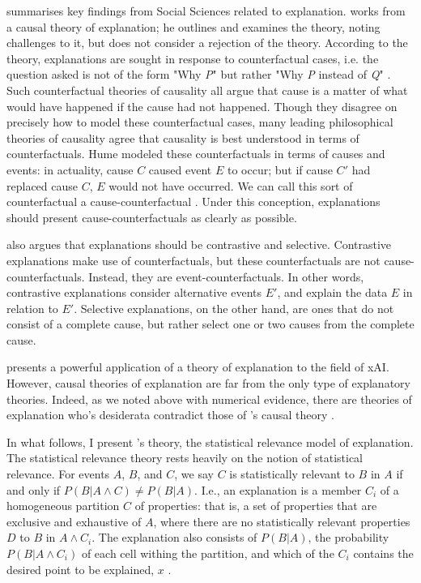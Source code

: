 \textcite{miller_explanation_2017} summarises key findings from Social Sciences related to explanation. \textcite{miller_explanation_2017} works from a causal theory of explanation; he outlines and examines the theory, noting challenges to it, but does not consider a rejection of the theory. According to the theory, explanations are sought in response to counterfactual cases, i.e. the question asked is not of the form "Why \textit{P}" but rather "Why \textit{P} instead of \textit{Q}" \cite{miller_explanation_2017}. Such counterfactual theories of causality all argue that cause is a matter of what would have happened if the cause had not happened. Though they disagree on precisely how to model these counterfactual cases, many leading philosophical theories of causality agree that causality is best understood in terms of counterfactuals. Hume modeled these counterfactuals in terms of causes and events: in actuality, cause $C$ caused event $E$ to occur; but if cause $C'$ had replaced cause $C$, $E$ would not have occurred. We can call this sort of counterfactual a cause-counterfactual \cite{miller_explanation_2017}. Under this conception, explanations should present cause-counterfactuals as clearly as possible.

\textcite{miller_explanation_2017} also argues that explanations should be contrastive and selective. Contrastive explanations make use of counterfactuals, but these counterfactuals are not cause-counterfactuals. Instead, they are event-counterfactuals. In other words, contrastive explanations consider alternative events $E'$, and explain the data $E$ in relation to $E'$. Selective explanations, on the other hand, are ones that do not consist of a complete cause, but rather select one or two causes from the complete cause. 

\textcite{miller_explanation_2017} presents a powerful application of a theory of explanation to the field of xAI. However, causal theories of explanation are far from the only type of explanatory theories. Indeed, as we noted above with numerical evidence, there are theories of explanation who's desiderata contradict those of \textcite{miller_explanation_2017}'s causal theory \cite{woodward_scientific_2021}. 

In what follows, I present \textcite{woodward_scientific_2021}'s theory, the statistical relevance model of explanation. The statistical relevance theory rests heavily on the notion of statistical relevance. For events $A$, $B$, and $C$, we say $C$ is statistically relevant to $B$ in $A$ if and only if $P(B | A \land C) \neq P(B | A)$. I.e., an explanation is a member $C_i$ of a homogeneous partition $C$ of properties: that is, a set of properties that are exclusive and exhaustive of $A$, where there are no statistically relevant properties $D$ to $B$ in $A \land C_i$. The explanation also consists of $P(B | A)$, the probability $P(B | A \land C_i)$ of each cell withing the partition, and which of the $C_i$ contains the desired point to be explained, $x$ \cite{woodward_scientific_2021}.

